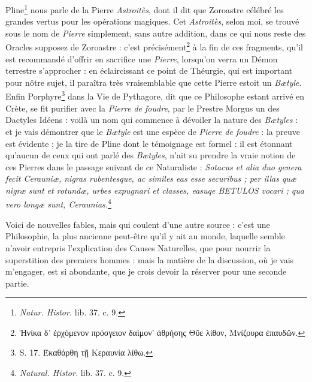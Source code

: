 \documentclass[a4paper, 11pt, oneside, polutonikogreek, french, landscape]{article}
\begin{document}
Pline\footnote{\emph{Natur. Histor.} lib. 37. c. 9.} nous parle de la Pierre \emph{Astroitès}, dont il dit que Zoroastre célébré les grandes vertus pour les opérations magiques. Cet \emph{Astroitès}, selon moi, se trouvé sous le nom de \emph{Pierre} simplement, sans autre addition, dans ce qui nous reste des Oracles supposez de Zoroastre : c'est précisément\footnote{Ἡνἰκα δ' ἐρχόμενον πρόσγειον δαἱμον' ἀθρήσης Θῦε λίθον, Μνίζουρα ἐπαυδὢν.} à la fin de ces fragments, qu'il est recommandé d'offrir en sacrifice une \emph{Pierre}, lorsqu'on verra un Démon terrestre s'approcher : en éclaircissant ce point de Théurgie, qui est important pour nôtre sujet, il paraîtra très vraisemblable que cette Pierre estoit un \emph{Bætyle}. Enfin Porphyre\footnote{S. 17. Ὲκαθάρθη τῇ Κεραυνία λίθω.} dans la Vie de Pythagore, dit que ce Philosophe estant arrivé en Crète, se fit purifier avec la \emph{Pierre de foudre}, par le Prestre Morgus un des Dactyles Idéens : voilà un nom qui commence à dévoiler la nature des \emph{Bætyles} : et je vais démontrer que le \emph{Bætyle} est une espèce de \emph{Pierre de foudre} : la preuve est évidente ; je la tire de Pline dont le témoignage est formel : il est étonnant qu'aucun de ceux qui ont parlé des \emph{Bætyles}, n'ait su prendre la vraie notion de ces Pierres dans le passage suivant de ce Naturaliste : \emph{Sotacus et alia duo genera fecit Cerauniæ, nigras rubentesque, ac similes eas esse securibus ; per illas quæ nigræ sunt et rotundæ, urbes expugnari et classes, easuqe BETULOS vocari ; qua vero longæ sunt, Ceraunias.}\footnote{\emph{Natural. Histor.} lib. 37. c. 9.}

Voici de nouvelles fables, mais qui coulent d'une autre source : c'est une Philosophie, la plus ancienne peut-être qu'il y ait au monde, laquelle semble n'avoir entrepris l'explication des Causes Naturelles, que pour nourrir la superstition des premiers hommes : mais la matière de la discussion, où je vais m'engager, est si abondante, que je crois devoir la réserver pour une seconde partie.
\clearpage
\end{document}
